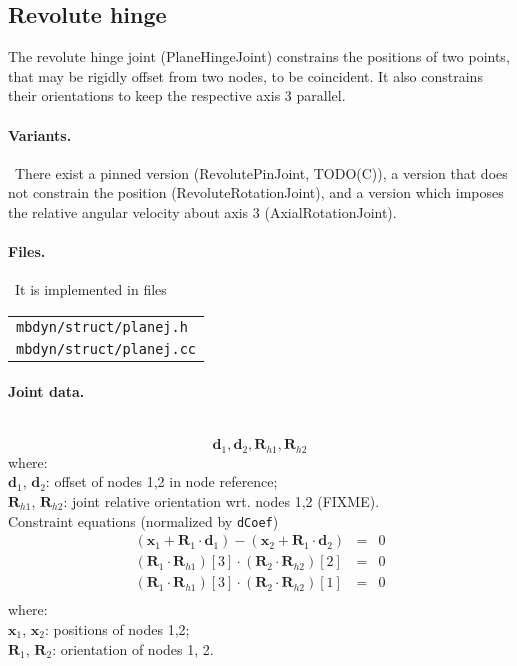 \documentclass[10pt,dvips,fleqn,subeqn]{report}
\newcommand{\T}[1]{\boldsymbol{#1}}
\begin{document}
\subsection{Revolute hinge}
The revolute hinge joint (PlaneHingeJoint) constrains the positions 
of two points, that may be rigidly offset from two nodes, 
to be coincident.
It also constrains their orientations to keep the respective axis 3 
parallel.

\paragraph{Variants.} \
There exist a pinned version (RevolutePinJoint, TODO(C)),
a version that does not constrain the position (RevoluteRotationJoint),
and a version which imposes the relative angular velocity about axis 3
(AxialRotationJoint).

\paragraph{Files.} \
It is implemented in files

\begin{tabular}{l}
\texttt{mbdyn/struct/planej.h} \\
\texttt{mbdyn/struct/planej.cc}
\end{tabular}

\paragraph{Joint data.} \
\begin{equation}
\T d_1, \T d_2, \T R_{h1}, \T R_{h2}
\end{equation}
where:\\
$\T d_1$, $\T d_2$: offset of nodes 1,2 in node reference;\\
$\T R_{h1}$, $\T R_{h2}$: joint relative orientation wrt. nodes 1,2 (FIXME).\\

\noindent
Constraint equations (normalized by \texttt{dCoef})
\begin{eqnarray*}
	(\T x_1+\T R_1\cdot \T d_1) - (\T x_2+\T R_1\cdot \T d_2)& = & 0 \\
	(\T R_1\cdot \T R_{h1})[3]\cdot (\T R_2\cdot \T R_{h2})[2] & = & 0 \\
	(\T R_1\cdot \T R_{h1})[3]\cdot (\T R_2\cdot \T R_{h2})[1] & = & 0 \\
\end{eqnarray*}
where:\\
$\T x_1$, $\T x_2$: positions of nodes 1,2;\\
$\T R_{1}$, $\T R_{2}$: orientation of nodes 1, 2.\\
\end{document}
